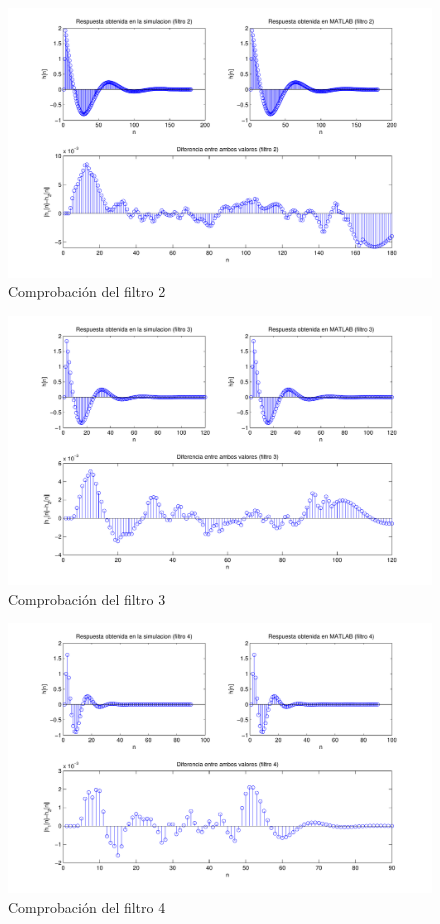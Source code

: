 \documentclass[a4paper,12pt]{report}
\begin{document}
\begin{figure}[hbt]
\includegraphics[width=\textwidth]{img/respfiltro2.pdf} 
\caption{Comprobación del filtro 2} \label{fig:filter2}
\end{figure}

\begin{figure}[hbt]
\includegraphics[width=\textwidth]{img/respfiltro3.pdf} 
\caption{Comprobación del filtro 3} \label{fig:filter3}
\end{figure}

\begin{figure}[hbt]
\includegraphics[width=\textwidth]{img/respfiltro4.pdf} 
\caption{Comprobación del filtro 4} \label{fig:filter4}
\end{figure}
\end{document}
